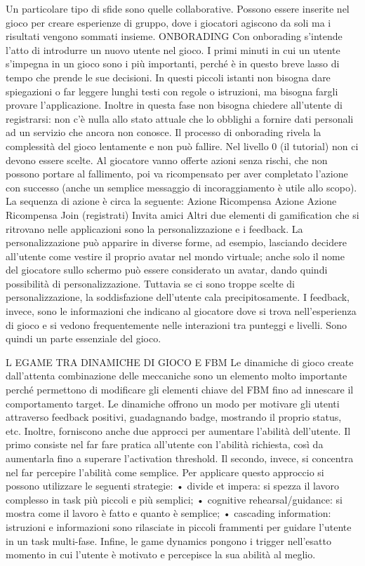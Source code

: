 Un particolare tipo di sfide sono quelle collaborative. Possono essere inserite nel gioco per creare esperienze di gruppo, dove i giocatori agiscono da soli ma i risultati vengono sommati insieme.
ONBORADING Con onborading s'intende l'atto di introdurre un nuovo utente nel gioco. I primi minuti in cui un utente s'impegna in un gioco sono i più importanti, perché è in questo breve lasso di tempo che prende le sue decisioni. In questi piccoli istanti non bisogna dare spiegazioni o far leggere lunghi testi con regole o istruzioni, ma bisogna fargli provare l'applicazione.
Inoltre in questa fase non bisogna chiedere all'utente di registrarsi: non c'è nulla allo stato attuale che lo obblighi a fornire dati personali ad un servizio che ancora non conosce.
Il processo di onborading rivela la complessità del gioco lentamente e non può fallire. Nel livello 0 (il tutorial) non ci devono essere scelte. Al giocatore vanno offerte azioni senza rischi, che non possono portare al fallimento, poi va ricompensato per aver completato l'azione con successo (anche un semplice messaggio di incoraggiamento è utile allo scopo). La sequenza di azione è circa
la seguente:
Azione
Ricompensa
Azione
Azione
Ricompensa
Join (registrati)
Invita amici
Altri due elementi di gamification che si ritrovano nelle applicazioni sono la personalizzazione e i feedback.
La personalizzazione può apparire in diverse forme, ad esempio, lasciando decidere all'utente come vestire il proprio avatar nel mondo virtuale; anche solo il nome del giocatore sullo schermo può essere considerato un avatar, dando quindi possibilità di personalizzazione. Tuttavia se ci sono troppe scelte di personalizzazione, la soddisfazione
dell'utente cala precipitosamente.
I feedback, invece, sono le informazioni che indicano al giocatore dove si trova nell'esperienza di gioco e si vedono frequentemente nelle interazioni tra punteggi e livelli. Sono quindi un parte essenziale del gioco.

L EGAME TRA DINAMICHE DI GIOCO E FBM
Le dinamiche di gioco create dall'attenta combinazione delle meccaniche sono un elemento molto importante perché permettono di modificare gli elementi chiave del FBM fino ad innescare il comportamento target.
Le dinamiche offrono un modo per motivare gli utenti attraverso feedback positivi, guadagnando badge, mostrando il proprio status, etc. Inoltre, forniscono anche due approcci per aumentare l'abilità dell'utente. Il primo consiste nel far fare pratica all'utente con l'abilità richiesta, così da aumentarla fino a superare l'activation threshold. Il secondo, invece, si concentra nel far percepire l'abilità come semplice. Per applicare questo  approccio si possono utilizzare le seguenti strategie:
• divide et impera: si spezza il lavoro complesso in task più piccoli e più semplici;
• cognitive rehearsal/guidance: si mostra come il lavoro è fatto e quanto è semplice;
• cascading information: istruzioni e informazioni sono rilasciate in piccoli frammenti per guidare l'utente in un task multi-fase.
Infine, le game dynamics pongono i trigger nell'esatto momento in cui l'utente è motivato e percepisce la sua abilità al meglio.

